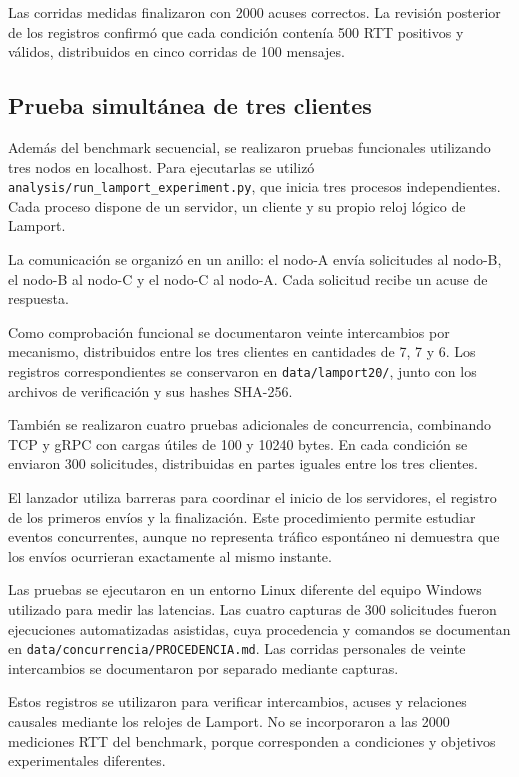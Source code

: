 Las corridas medidas finalizaron con 2000 acuses correctos. La revisión
posterior de los registros confirmó que cada condición contenía 500 RTT
positivos y válidos, distribuidos en cinco corridas de 100 mensajes.

\subsection{Prueba simultánea de tres clientes}

Además del benchmark secuencial, se realizaron pruebas funcionales utilizando tres nodos en localhost. Para ejecutarlas se utilizó \texttt{analysis/run\_lamport\_experiment.py}, que inicia tres procesos independientes. Cada proceso dispone de un servidor, un cliente y su propio reloj lógico de Lamport.

La comunicación se organizó en un anillo: el nodo-A envía solicitudes al nodo-B, el nodo-B al nodo-C y el nodo-C al nodo-A. Cada solicitud recibe un acuse de respuesta.

Como comprobación funcional se documentaron veinte intercambios por mecanismo, distribuidos entre los tres clientes en cantidades de 7, 7 y 6. Los registros correspondientes se conservaron en \texttt{data/lamport20/}, junto con los archivos de verificación y sus hashes SHA-256.

También se realizaron cuatro pruebas adicionales de concurrencia, combinando TCP y gRPC con cargas útiles de 100 y 10240 bytes. En cada condición se enviaron 300 solicitudes, distribuidas en partes iguales entre los tres clientes.

El lanzador utiliza barreras para coordinar el inicio de los servidores, el registro de los primeros envíos y la finalización. Este procedimiento permite estudiar eventos concurrentes, aunque no representa tráfico espontáneo ni demuestra que los envíos ocurrieran exactamente al mismo instante.

Las pruebas se ejecutaron en un entorno Linux diferente del equipo Windows utilizado para medir las latencias. Las cuatro capturas de 300 solicitudes fueron ejecuciones automatizadas asistidas, cuya procedencia y comandos se documentan en \texttt{data/concurrencia/PROCEDENCIA.md}. Las corridas personales de veinte intercambios se documentaron por separado mediante capturas.

Estos registros se utilizaron para verificar intercambios, acuses y relaciones causales mediante los relojes de Lamport. No se incorporaron a las 2000 mediciones RTT del benchmark, porque corresponden a condiciones y objetivos experimentales diferentes.


